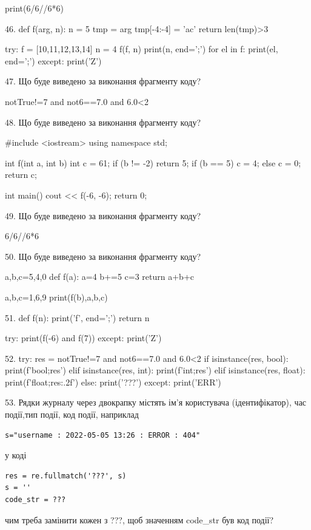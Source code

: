 \documentclass[11pt]{article}
\begin{document}
print(6/6//6*6)


46. 
def f(arg, n):
    n = 5
    tmp = arg
    tmp[-4:-4] = 'ac'
    return len(tmp)>3

try:
    f = [10,11,12,13,14]
    n = 4
    f(f, n)
    print(n, end=';')
    for el in f:
        print(el, end=';')
except:
    print('Z')


47. Що буде виведено за виконання фрагменту коду?

notTrue!=7 and not6==7.0 and 6.0<2


48. Що буде виведено за виконання фрагменту коду?

#include <iostream>
using namespace std;

int f(int a, int b){
    int c = 61;
    if (b != -2)
        return 5;
    if (b == 5)
         c = 4;
    else 
        c = 0;
    return c;
}

int main(){
    cout << f(-6, -6);
    return 0;
}


49. Що буде виведено за виконання фрагменту коду?

6/6//6*6


50. Що буде виведено за виконання фрагменту коду?

a,b,c=5,4,0
def f(a):
    a=4
    b+=5
    c=3
    return a+b+c

a,b,c=1,6,9
print(f(b),a,b,c)


51. 
def f(n):
    print('f', end=';')
    return n

try:
    print(f(-6) and f(7))
except:
    print('Z')


52. 
try:
    res = notTrue!=7 and not6==7.0 and 6.0<2
    if isinstance(res, bool):
        print(f'bool;{res}')
    elif isinstance(res, int):
        print(f'int;{res}')
    elif isinstance(res, float):
        print(f'float;{res:.2f}')
    else:
        print('???')
except:
    print('ERR')


53. 
Рядки журналу через двокрапку містять ім'я користувача (ідентифікатор), час події,тип події, код події, наприклад
\begin{verbatim}
s="username : 2022-05-05 13:26 : ERROR : 404"
\end{verbatim}
у коді 
\begin{verbatim}
res = re.fullmatch('???', s) 
s = ''
code_str = ??? 
\end{verbatim}
чим треба замінити кожен з ???, щоб значенням code\_str був код події? 
\end{document}
